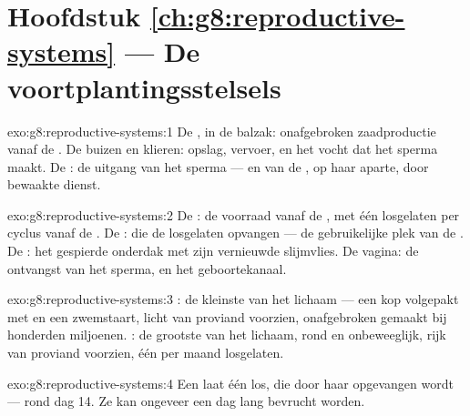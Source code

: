 \section*{Hoofdstuk \ref{ch:g8:reproductive-systems} --- De voortplantingsstelsels}

\begin{solution}{exo:g8:reproductive-systems:1}
De , in de balzak: onafgebroken zaadproductie vanaf de .
De buizen en klieren: opslag, vervoer, en het vocht dat het sperma maakt.
De : de uitgang van het sperma --- en van de , op haar aparte,
door  bewaakte dienst.
\end{solution}

\begin{solution}{exo:g8:reproductive-systems:2}
De : de voorraad  vanaf de , met één losgelaten
per cyclus vanaf de . De : die de losgelaten 
opvangen --- de gebruikelijke plek van de . De : het
gespierde onderdak met zijn vernieuwde slijmvlies. De vagina: de ontvangst
van het sperma, en het geboortekanaal.
\end{solution}

\begin{solution}{exo:g8:reproductive-systems:3}
: de kleinste van het lichaam --- een kop volgepakt met  en
een zwemstaart, licht van proviand voorzien, onafgebroken gemaakt bij
honderden miljoenen. : de grootste van het lichaam, rond en
onbeweeglijk, rijk van proviand voorzien, één per maand losgelaten.
\end{solution}

\begin{solution}{exo:g8:reproductive-systems:4}
Een  laat één  los, die door haar  opgevangen wordt
--- rond dag 14. Ze kan ongeveer een dag lang bevrucht worden.
\end{solution}

